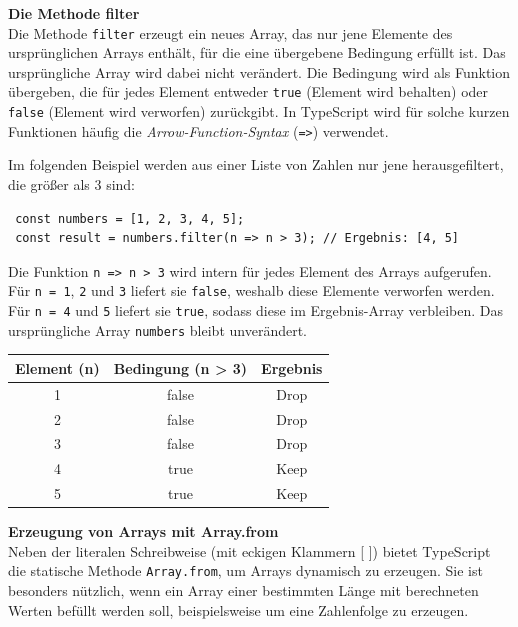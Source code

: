 \textbf{Die Methode filter}\\
Die Methode \texttt{filter} erzeugt ein neues Array, das nur jene Elemente des ursprünglichen Arrays enthält, für die eine übergebene Bedingung erfüllt ist. Das ursprüngliche Array wird dabei nicht verändert. Die Bedingung wird als Funktion übergeben, die für jedes Element entweder \texttt{true} (Element wird behalten) oder \texttt{false} (Element wird verworfen) zurückgibt. In TypeScript wird für solche kurzen Funktionen häufig die \textit{Arrow-Function-Syntax} (\texttt{=>}) verwendet. 

Im folgenden Beispiel werden aus einer Liste von Zahlen nur jene herausgefiltert, die größer als 3 sind:
\begin{verbatim}
 const numbers = [1, 2, 3, 4, 5];
 const result = numbers.filter(n => n > 3); // Ergebnis: [4, 5]
\end{verbatim}

Die Funktion \texttt{n => n > 3} wird intern für jedes Element des Arrays aufgerufen. Für \texttt{n = 1}, \texttt{2} und \texttt{3} liefert sie \texttt{false}, weshalb diese Elemente verworfen werden. Für \texttt{n = 4} und \texttt{5} liefert sie \texttt{true}, sodass diese im Ergebnis-Array verbleiben. Das ursprüngliche Array \texttt{numbers} bleibt unverändert.

\begin{table}[h]
	\centering
	\begin{tabular}{|c|c|c|}
		\hline
		\textbf{Element (n)} & \textbf{Bedingung (n > 3)} & \textbf{Ergebnis} \\ \hline
		1 & false & Drop \\ \hline
		2 & false & Drop \\ \hline
		3 & false & Drop \\ \hline
		4 & true  & Keep \\ \hline
		5 & true  & Keep \\ \hline
	\end{tabular}
\end{table}
\FloatBarrier

\noindent\textbf{Erzeugung von Arrays mit Array.from}\\
Neben der literalen Schreibweise (mit eckigen Klammern [ ]) bietet TypeScript die statische Methode \texttt{Array.from}, um Arrays dynamisch zu erzeugen. Sie ist besonders nützlich, wenn ein Array einer bestimmten Länge mit berechneten Werten befüllt werden soll, beispielsweise um eine Zahlenfolge zu erzeugen.

